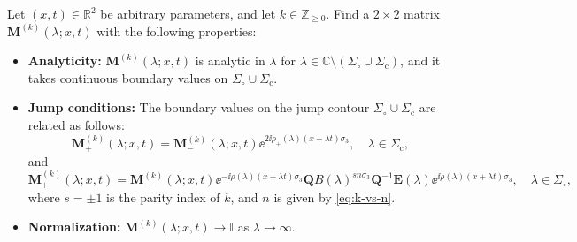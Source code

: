 \begin{rhp}
Let $(x,t)\in\mathbb{R}^2$ be arbitrary parameters, and let $k\in\mathbb{Z}_{\ge 0}$.  Find a $2\times 2$ matrix $\mathbf{M}^{(k)}(\lambda;x,t)$ with the following properties:
\begin{itemize}
\item[]\textbf{Analyticity:}  $\mathbf{M}^{(k)}(\lambda;x,t)$ is analytic in $\lambda$ for $\lambda\in\mathbb{C}\setminus(\Sigma_\circ\cup\Sigma_\mathrm{c})$, and it takes continuous boundary values on $\Sigma_\circ\cup\Sigma_\mathrm{c}$.
\item[]\textbf{Jump conditions:}  The boundary values on the jump contour $\Sigma_\circ\cup\Sigma_\mathrm{c}$ are related as follows:
\begin{equation}
\mathbf{M}_+^{(k)}(\lambda;x,t)=\mathbf{M}_-^{(k)}(\lambda;x,t)\ee^{2\ii\rho_+(\lambda)(x+\lambda t)\sigma_3},\quad \lambda\in\Sigma_\mathrm{c},
\label{eq:jump-cut}
\end{equation}
and
\begin{equation}
\mathbf{M}_+^{(k)}(\lambda;x,t)=\mathbf{M}_-^{(k)}(\lambda;x,t)\ee^{-\ii\rho(\lambda)(x+\lambda t)\sigma_3}\mathbf{Q}
B(\lambda)^{sn\sigma_3}
\mathbf{Q}^{-1}\mathbf{E}(\lambda)\ee^{\ii\rho(\lambda)(x+\lambda t)\sigma_3},\quad
\lambda\in\Sigma_\circ,
\end{equation}
where $s=\pm 1$ is the parity index of $k$, and $n$ is given by \eqref{eq:k-vs-n}.
\item[]\textbf{Normalization:}  $\mathbf{M}^{(k)}(\lambda;x,t)\to\mathbb{I}$ as $\lambda\to\infty$. 
\end{itemize}
\label{rhp:rogue-wave}
\end{rhp}
